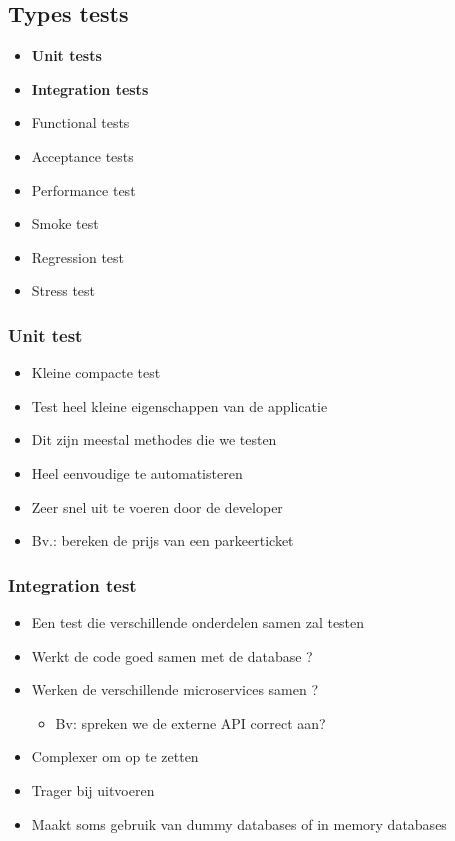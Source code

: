 \documentclass{article}
\begin{document}
\subsection{Types tests}

\begin{itemize}
    \item \textbf{Unit tests}
    \item \textbf{Integration tests}
    \item Functional tests
    \item Acceptance tests
    \item Performance test
    \item Smoke test
    \item Regression test
    \item Stress test
\end{itemize}

\subsubsection{Unit test}

\begin{itemize}
    \item Kleine compacte test
    \item Test heel kleine eigenschappen van de applicatie
    \item Dit zijn meestal methodes die we testen
    \item Heel eenvoudige te automatisteren
    \item Zeer snel uit te voeren door de developer
    \item Bv.: bereken de prijs van een parkeerticket
\end{itemize}

\subsubsection{Integration test}

\begin{itemize}
    \item Een test die verschillende onderdelen samen zal testen
    \item Werkt de code goed samen met de database ?
    \item Werken de verschillende microservices samen ?
    \begin{itemize}
        \item Bv: spreken we de externe API correct aan?
    \end{itemize}
    \item Complexer om op te zetten
    \item Trager bij uitvoeren
    \item Maakt soms gebruik van dummy databases of in memory databases
\end{itemize}
\end{document}
